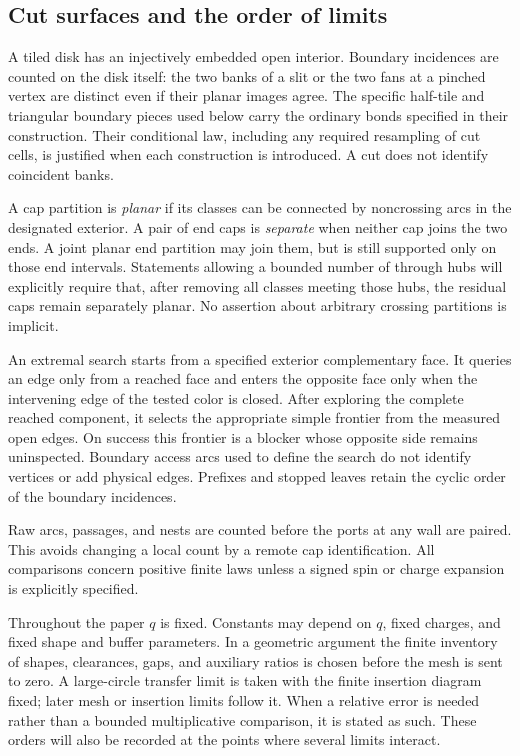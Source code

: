 \subsection{Cut surfaces and the order of limits}

A tiled disk has an injectively embedded open interior. Boundary
incidences are counted on the disk itself: the two banks of a slit or
the two fans at a pinched vertex are distinct even if their planar
images agree. The specific half-tile and triangular boundary pieces
used below carry the ordinary bonds specified in their construction.
Their conditional law, including any required resampling of cut cells,
is justified when each construction is introduced. A cut does not
identify coincident banks.

A cap partition is \emph{planar} if its classes can be connected by
noncrossing arcs in the designated exterior. A pair of end caps is
\emph{separate} when neither cap joins the two ends. A joint planar
end partition may join them, but is still supported only on those
end intervals. Statements allowing a bounded number of through hubs
will explicitly require that, after removing all classes meeting
those hubs, the residual caps remain separately planar. No assertion
about arbitrary crossing partitions is implicit.

An extremal search starts from a specified exterior complementary face.
It queries an edge only from a reached face and enters the opposite face
only when the intervening edge of the tested color is closed. After
exploring the complete reached component, it selects the appropriate
simple frontier from the measured open edges. On success this frontier
is a blocker whose opposite side remains uninspected. Boundary access
arcs used to define the search do not identify vertices or add physical
edges. Prefixes and stopped leaves retain the cyclic order of the
boundary incidences.

Raw arcs, passages, and nests are counted before the ports at any
wall are paired. This avoids changing a local count by a remote cap
identification. All comparisons concern positive finite laws unless
a signed spin or charge expansion is explicitly specified.

Throughout the paper $q$ is fixed. Constants may depend on $q$,
fixed charges, and fixed shape and buffer parameters. In a geometric
argument the finite inventory of shapes, clearances, gaps, and auxiliary
ratios is chosen before the mesh is sent to zero. A large-circle
transfer limit is taken with the finite insertion diagram fixed;
later mesh or insertion limits follow it. When a relative error is
needed rather than a bounded multiplicative comparison, it is stated
as such. These orders will also be recorded at the points where
several limits interact.
